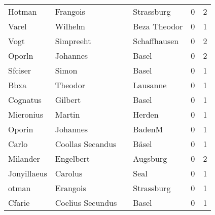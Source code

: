 \begin{center}
\begin{tiny}
\begin{longtabu}{llllrr}
                   Hotman &                           Frangois &             &                                  Strassburg &          0 &         2 \\
                    Varel &                            Wilhelm &             &                                Beza Theodor &          0 &         1 \\
                     Vogt &                          Simpreeht &             &                                Schaffhausen &          0 &         2 \\
                   Oporln &                           Johannes &             &                                       Basel &          0 &         2 \\
                  Sfciser &                              Simon &             &                                       Basel &          0 &         1 \\
                     Bbxa &                            Theodor &             &                                    Lausanne &          0 &         1 \\
                 Cognatus &                            Gilbert &             &                                       Basel &          0 &         1 \\
                Mieronius &                             Martin &             &                                      Herden &          0 &         1 \\
                   Oporin &                           Johannes &             &                                      BadenM &          0 &         1 \\
                    Carlo &                   Coollas Secandus &             &                                       Bäsel &          0 &         1 \\
                 Milander &                          Engelbert &             &                                    Augsburg &          0 &         2 \\
              Jonyillaeus &                            Carolus &             &                                        Seal &          0 &         1 \\
                    otman &                           Erangois &             &                                  Strassburg &          0 &         1 \\
                   Cfarie &                   Coelius Secundus &             &                                       Basel &          0 &         1 \\

\end{longtabu}
\end{tiny}
\end{center}
